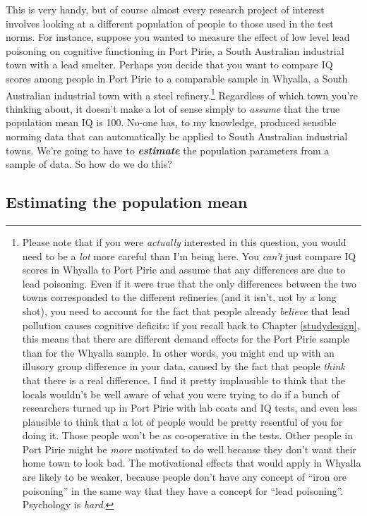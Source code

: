 \documentclass[spanish,]{book}
\let\rmarkdownfootnote\footnote%
\def\footnote{\protect\rmarkdownfootnote}
\begin{document}
This is very handy, but of course almost every research project of
interest involves looking at a different population of people to those
used in the test norms. For instance, suppose you wanted to measure the
effect of low level lead poisoning on cognitive functioning in Port
Pirie, a South Australian industrial town with a lead smelter. Perhaps
you decide that you want to compare IQ scores among people in Port Pirie
to a comparable sample in Whyalla, a South Australian industrial town
with a steel refinery.\footnote{Please note that if you were
  \emph{actually} interested in this question, you would need to be a
  \emph{lot} more careful than I'm being here. You \emph{can't} just
  compare IQ scores in Whyalla to Port Pirie and assume that any
  differences are due to lead poisoning. Even if it were true that the
  only differences between the two towns corresponded to the different
  refineries (and it isn't, not by a long shot), you need to account for
  the fact that people already \emph{believe} that lead pollution causes
  cognitive deficits: if you recall back to Chapter \ref{studydesign},
  this means that there are different demand effects for the Port Pirie
  sample than for the Whyalla sample. In other words, you might end up
  with an illusory group difference in your data, caused by the fact
  that people \emph{think} that there is a real difference. I find it
  pretty implausible to think that the locals wouldn't be well aware of
  what you were trying to do if a bunch of researchers turned up in Port
  Pirie with lab coats and IQ tests, and even less plausible to think
  that a lot of people would be pretty resentful of you for doing it.
  Those people won't be as co-operative in the tests. Other people in
  Port Pirie might be \emph{more} motivated to do well because they
  don't want their home town to look bad. The motivational effects that
  would apply in Whyalla are likely to be weaker, because people don't
  have any concept of ``iron ore poisoning'' in the same way that they
  have a concept for ``lead poisoning''. Psychology is \emph{hard}.}
Regardless of which town you're thinking about, it doesn't make a lot of
sense simply to \emph{assume} that the true population mean IQ is 100.
No-one has, to my knowledge, produced sensible norming data that can
automatically be applied to South Australian industrial towns. We're
going to have to \textbf{\emph{estimate}} the population parameters from
a sample of data. So how do we do this?

\subsection{Estimating the population
mean}\label{estimating-the-population-mean}
\end{document}
